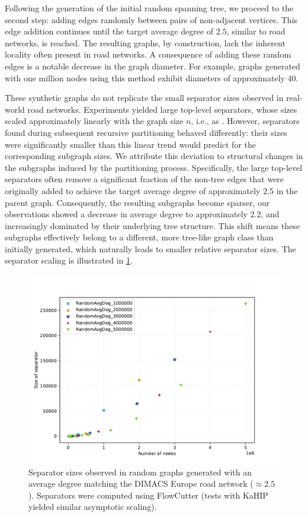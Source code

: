 Following the generation of the initial random spanning tree, we proceed to the second step: adding edges randomly between pairs of non-adjacent vertices.
This edge addition continues until the target average degree of \(2.5\), similar to road networks, is reached.
The resulting graphs, by construction, lack the inherent locality often present in road networks.
A consequence of adding these random edges is a notable decrease in the graph diameter.
For example, graphs generated with one million nodes using this method exhibit diameters of approximately 40.

These synthetic graphs do not replicate the small separator sizes observed in real-world road networks.
Experiments yielded large top-level separators, whose sizes scaled approximately linearly with the graph size \(n\), i.e., as .
However, separators found during subsequent recursive partitioning behaved differently: their sizes were significantly smaller than this linear trend would predict for the corresponding subgraph sizes.
We attribute this deviation to structural changes in the subgraphs induced by the partitioning process.
Specifically, the large top-level separators often remove a significant fraction of the non-tree edges that were originally added to achieve the target average degree of approximately \(2.5\) in the parent graph.
Consequently, the resulting subgraphs become sparser, our observations showed a decrease in average degree to approximately \(2.2\), and increasingly dominated by their underlying tree structure.
This shift means these subgraphs effectively belong to a different, more tree-like graph class than initially generated, which naturally leads to smaller relative separator sizes.
The separator scaling is illustrated in \cref{fig:same_degree}.



\begin{figure}[tbhp]
	\centering
	\includegraphics[width=0.6\linewidth]{graphics/RandomAvgDeg2.5.pdf}
	\caption{Separator sizes observed in random graphs generated with an average degree matching the DIMACS Europe road network (\( \approx 2.5 \)). Separators were computed using FlowCutter (tests with KaHIP yielded similar asymptotic scaling).}
	\label{fig:same_degree}
\end{figure}


